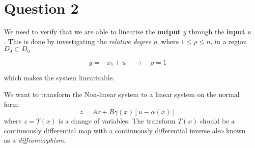 \chapter{Question 2}

We need to verify that we are able to linearise the \textbf{output} $y$ through the \textbf{input} $u$. This is done by investigating the \textit{relative degree} $\rho$, where $1 \leq \rho \leq n$, in a region $D_0 \subset D_0$

\begin{equation}
        \dot{y} = -x_1 + u \quad \rightarrow \quad \rho = 1
\end{equation}

which makes the system linearisable.

We want to transform the Non-linear system to a linear system on the normal form:
\begin{equation}
        \dot{z} = Az + B\gamma(x) \left[u-\alpha(x)\right]
\end{equation}
where $z = T(x)$ is a change of variables. The transform $T(x)$ should be a continuously differential map with a continuously differential inverse also known as a \textit{diffeomorphism}.

